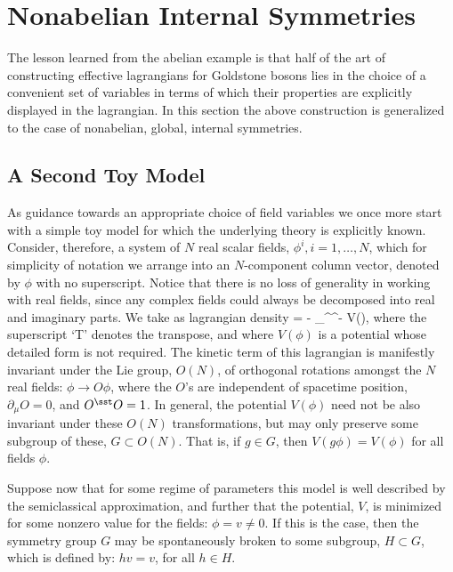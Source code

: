 \documentclass[12pt,epsf]{report}
\begin{document}
\section{Nonabelian Internal Symmetries}

The lesson learned from the abelian example is that half of
the art of constructing effective lagrangians for Goldstone
bosons lies in the choice of a convenient set of variables
in terms of which their properties are explicitly displayed
in the lagrangian. In this section the above construction is
generalized to the case of nonabelian, global, internal
symmetries.

\subsection{A Second Toy Model}

As guidance towards an appropriate choice of field
variables we once more start with a simple toy model for
which the underlying theory is explicitly known. Consider,
therefore, a system of $N$ real scalar fields, $\phi^i, i =
1,\dots,N$, which for simplicity of notation we arrange into
an $N$-component column vector, denoted by $\phi$ with no
superscript. Notice that there is no loss of generality in
working with real fields, since any complex fields could
always be decomposed into  real and imaginary parts. We
take as lagrangian density
%
\eq
\label{nonabeltm}
\Scl = - \hf \; \partial_\mu \phi^\sst \partial^\mu \phi -
V(\phi),
\eeq
%
where the superscript `T' denotes the transpose, and where
$V(\phi)$ is a potential whose detailed form is not
required. The kinetic term of this lagrangian is manifestly
invariant under the Lie group, $O(N)$, of orthogonal
rotations amongst the $N$ real fields: $\phi \to O \phi$,
where the $O$'s are independent of spacetime position,
$\partial_\mu O  =0$, and $O^\sst O = 1$. In general, the
potential $V(\phi)$ need not be also invariant under these
$O(N)$ transformations, but may only preserve some subgroup
of these, $G \subset O(N)$. That is, if $g \in G$, then $V(g
\phi) = V(\phi)$ for all fields $\phi$.

Suppose now that for some regime of parameters this model
is well described by the semiclassical approximation, and
further that the potential, $V$, is minimized for some
nonzero value for the fields: $\phi = v \neq 0$. If this is
the case, then the symmetry group $G$ may be spontaneously
broken to some subgroup, $H 
\subset G$, which is defined by: $h v = v$, for all $h \in
H$.
\end{document}
